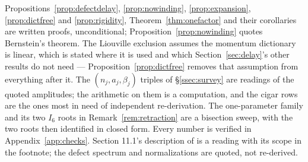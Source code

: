 \begin{remark}\label{rem:delaystatus}
Propositions~\ref{prop:defectdelay}, \ref{prop:nowinding}, \ref{prop:expansion},
\ref{prop:dictfree} and \ref{prop:rigidity}, Theorem~\ref{thm:onefactor} and
their corollaries are written proofs, unconditional;
Proposition~\ref{prop:nowinding} quotes Bernstein's theorem. The Liouville
exclusion assumes the momentum dictionary is linear, which is stated where it is
used and which Section~\ref{sec:delay}'s other results do not need ---
Proposition~\ref{prop:dictfree} removes that assumption from everything after it.
The $(n_j,a_j,\beta_j)$ triples of \S\ref{ssec:survey} are readings of the quoted
amplitudes; the arithmetic on them is a computation, and the cigar rows are the
ones most in need of independent re-derivation. The one-parameter family and its
two $I_6$ roots in Remark~\ref{rem:retraction} are a bisection sweep, with the two
roots then identified in closed form. Every number
is verified in Appendix~\ref{app:checks}. Section 11.1's description of
\cite{OWL} is a reading with its scope in the footnote; the defect spectrum and
normalizations are quoted, not re-derived.
\end{remark}
